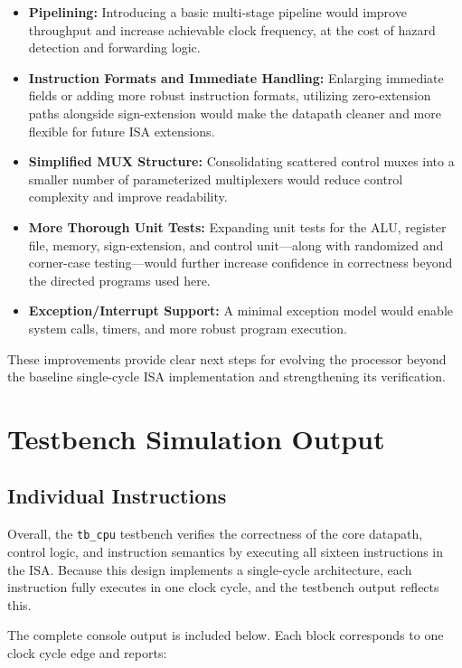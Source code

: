 \documentclass[12pt]{report}
\begin{document}
\begin{itemize}
    \item \textbf{Pipelining:} Introducing a basic multi-stage pipeline would
        improve throughput and increase achievable clock frequency, at the
        cost of hazard detection and forwarding logic.
    \item \textbf{Instruction Formats and Immediate Handling:} Enlarging immediate fields or
        adding more robust instruction formats, utilizing zero-extension
        paths alongside sign-extension would make the datapath cleaner and
        more flexible for future ISA extensions.
    \item \textbf{Simplified MUX Structure:} Consolidating scattered control
        muxes into a smaller number of parameterized multiplexers
        would reduce control complexity and improve readability.
    \item \textbf{More Thorough Unit Tests:} Expanding unit tests for the ALU,
        register file, memory, sign-extension, and control unit—along with
        randomized and corner-case testing—would further increase confidence
        in correctness beyond the directed programs used here.
    \item \textbf{Exception/Interrupt Support:} A minimal exception model would
        enable system calls, timers, and more robust program execution.
\end{itemize}

These improvements provide clear next steps for evolving the processor beyond
the baseline single-cycle ISA implementation and strengthening its verification.


\chapter{Testbench Simulation Output}
\section{Individual Instructions}
Overall, the \texttt{tb\_cpu} testbench verifies the correctness of the core
datapath, control logic, and instruction semantics by executing all sixteen instructions in the ISA. Because
this design implements a single-cycle architecture, each instruction fully
executes in one clock cycle, and the testbench output reflects this.

The complete console output is included below. Each block corresponds to one
clock cycle edge and reports:
\end{document}
